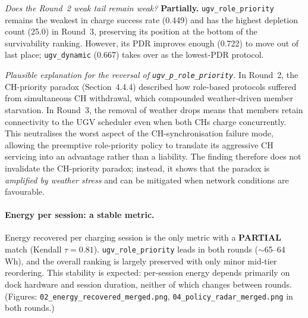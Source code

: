 \emph{Does the Round~2 weak tail remain weak?}
\textbf{Partially.}  \texttt{ugv\_role\_priority} remains the weakest
in charge success rate (0.449) and has the highest depletion count
(25.0) in Round~3, preserving its position at the bottom of the
survivability ranking.  However, its PDR improves enough (0.722) to
move out of last place; \texttt{ugv\_dynamic} (0.667) takes over as
the lowest-PDR protocol.

\emph{Plausible explanation for the reversal of
\texttt{ugv\_p\_role\_priority}.}
In Round~2, the CH-priority paradox (Section~4.4.4) described how
role-based protocols suffered from simultaneous CH withdrawal, which
compounded weather-driven member starvation.  In Round~3, the removal
of weather drops means that members retain connectivity to the UGV
scheduler even when both CHs charge concurrently.  This neutralises
the worst aspect of the CH-synchronisation failure mode, allowing
the preemptive role-priority policy to translate its aggressive CH
servicing into an advantage rather than a liability.  The finding
therefore does not invalidate the CH-priority paradox; instead, it
shows that the paradox is \emph{amplified by weather stress} and can
be mitigated when network conditions are favourable.

\paragraph{Energy per session: a stable metric.}

Energy recovered per charging session is the only metric with a
\textbf{PARTIAL} match (Kendall $\tau = 0.81$).
\texttt{ugv\_role\_priority} leads in both rounds ($\sim$65--64\,Wh),
and the overall ranking is largely preserved with only minor
mid-tier reordering.  This stability is expected: per-session energy
depends primarily on dock hardware and session duration, neither of
which changes between rounds.
(Figures: \texttt{02\_energy\_recovered\_merged.png},
\texttt{04\_policy\_radar\_merged.png} in both rounds.)

